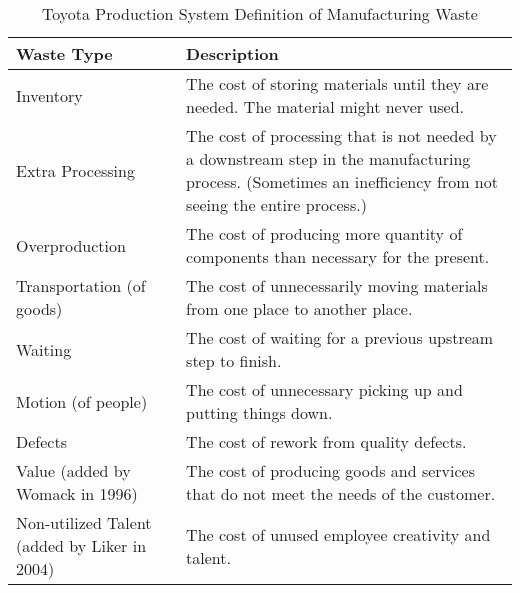 \begin{table}[t]
\renewcommand{\arraystretch}{1.5}
\centering
\caption{Toyota Production System Definition of Manufacturing Waste}
\label{ManufacturingWaste}
\begin{tabular}{|p{2in}|p{4in}|}
\hline


Waste Type                & Description                                                                                                                                                  \\ \hline
Inventory                 & The cost of storing materials until they are needed. The material might never used.                                                                   \\ \hline
Extra Processing          & The cost of processing that is not needed by a downstream step in the manufacturing process. (Sometimes an inefficiency from not seeing the entire process.) \\ \hline
Overproduction            & The cost of producing more quantity of components than necessary for the present.                                                                            \\ \hline
Transportation (of goods) & The cost of unnecessarily moving materials from one place to another place.                                                                                  \\ \hline
Waiting                   & The cost of waiting for a previous upstream step to finish.                                                                                                       \\ \hline
Motion (of people)        & The cost of unnecessary picking up and putting things down.                                                                                                  \\ \hline
Defects                   & The cost of rework from quality defects.                                                                                                                     \\ \hline
Value (added by Womack in 1996)                     & The cost of producing goods and services that do not meet the needs of the customer.                                                                         \\ \hline
Non-utilized Talent (added by Liker in 2004)      & The cost of unused employee creativity and talent.                                                                                                           \\ \hline
\end{tabular}
\end{table}



